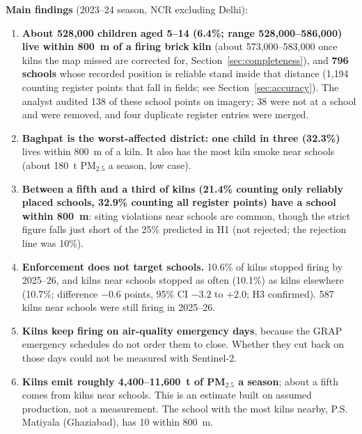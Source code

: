 \documentclass[11pt,a4paper]{article}
\begin{document}
\textbf{Main findings} (2023--24 season, NCR excluding Delhi):
\begin{enumerate}[leftmargin=*]
\item \textbf{About 528{,}000 children aged 5--14 (6.4\%; range 528{,}000--586{,}000) live within 800~m of
a firing brick kiln} (about 573{,}000--583{,}000 once kilns the map missed are
corrected for, Section~\ref{sec:completeness}), and \textbf{796 schools} whose recorded position is reliable stand inside that distance (1{,}194 counting register points that fall in fields; see Section~\ref{sec:accuracy}). The analyst audited 138 of these school points on imagery; 38 were not at a school and were removed, and four duplicate register entries were merged.
\item \textbf{Baghpat is the worst-affected district: one child in three
(32.3\%)} lives within 800~m of a kiln. It also has the most kiln smoke near
schools (about 180~t PM$_{2.5}$ a season, low case).
\item \textbf{Between a fifth and a third of kilns (21.4\% counting only reliably
placed schools, 32.9\% counting all register points) have a school within 800~m}:
siting violations near schools are common, though the strict figure falls just
short of the 25\% predicted in H1 (not rejected; the rejection line was 10\%).
\item \textbf{Enforcement does not target schools.} 10.6\% of kilns stopped
firing by 2025--26, and kilns near schools stopped as often (10.1\%) as kilns
elsewhere (10.7\%; difference $-0.6$ points, 95\% CI $-3.2$ to $+2.0$;
H3 confirmed). 587 kilns near schools were still firing in 2025--26.
\item \textbf{Kilns keep firing on air-quality emergency days}, because the GRAP
emergency schedules do not order them to close. Whether they cut back on those
days could not be measured with Sentinel-2.
\item \textbf{Kilns emit roughly 4{,}400--11{,}600~t of PM$_{2.5}$ a season};
about a fifth comes from kilns near schools. This is an estimate built on assumed
production, not a measurement. The school with the most kilns nearby, P.S.
Matiyala (Ghaziabad), has 10 within 800~m.
\end{enumerate}
\end{document}
